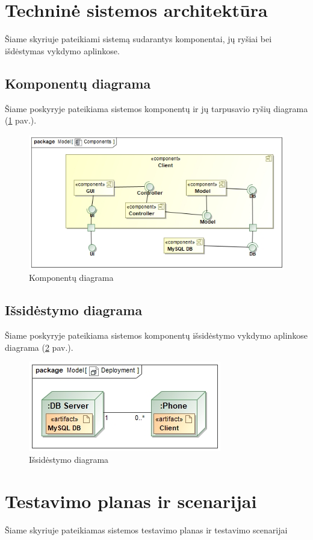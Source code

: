\documentclass{VUMIFPSbakalaurinis}
\begin{document}
\section{Techninė sistemos architektūra}
Šiame skyriuje pateikiami sistemą sudarantys komponentai, jų ryšiai bei išdėstymas vykdymo aplinkose.

\subsection{Komponentų diagrama}
Šiame poskyryje pateikiama sistemos komponentų ir jų tarpusavio ryšių diagrama (\ref {img:components} pav.).
\begin{figure}[h]
	\centering
	\includegraphics[scale=0.7]{img/Components}
	\caption{Komponentų diagrama}
	\label{img:components}
\end{figure}

\subsection{Išsidėstymo diagrama}
Šiame poskyryje pateikiama sistemos komponentų išsidėstymo vykdymo aplinkose diagrama (\ref{img:deployment} pav.).
\begin{figure}[h]
	\centering
	\includegraphics[scale=0.7]{img/Deployment}
	\caption{Išsidėstymo diagrama}
	\label{img:deployment}
\end{figure}

\section{Testavimo planas ir scenarijai}
Šiame skyriuje pateikiamas sistemos testavimo planas ir testavimo scenarijai
\end{document}
